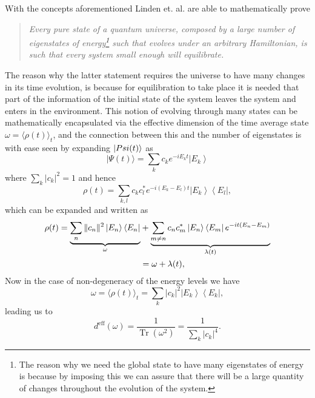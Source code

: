 \indent With the concepts aforementioned Linden et. al. \cite{linden_quantum_2009} are able to mathematically prove
\begin{quote}
\textit{Every pure state of a quantum universe, composed by a large number of eigenstates of energy\footnote{The reason why we need the global state to have many eigenstates of energy is because by imposing this we can assure that there will be a large quantity of changes throughout the evolution of the system.} such that evolves under an arbitrary Hamiltonian, is such that every system small enough will equilibrate.}
\end{quote}
\indent The reason why the latter statement requires the universe to have many changes in its time evolution, is because for equilibration to take place it is needed that part of the information of the initial state of the system leaves the system and enters in the environment. This notion of evolving through many states can be mathematically encapsulated via the effective dimension of the time average state $\omega=\langle\rho(t)\rangle_{t}$, and the connection between this and the number of eigenstates is with ease seen by expanding $\mathinner{|{Psi(t)}\rangle}$ as
\begin{equation}
|\Psi(t)\rangle=\sum_{k} c_{k} e^{-i E_{k} t}\left|E_{k}\right\rangle
\label{CH1:expansion_1}
\end{equation}
where $\sum_{k}\left|c_{k}\right|^{2}=1$ and hence
\begin{equation}
\rho(t)=\sum_{k, l} c_{k} c_{l}^{*} e^{-i\left(E_{k}-E_{l}\right) t}\left|E_{k}\right\rangle\left\langle E_{l}\right|,
\label{CH1:expansion_2}
\end{equation}
which can be expanded and written as
\begin{equation}
\begin{aligned}
\rho(t)=\underbrace{\sum_{n}\|c_{n}\|^{2}\mathinner{|{E_{n}}\rangle}\mathinner{\langle{E_{n}}|}}_{\omega}&+\underbrace{\sum_{m \neq n} c_{n} c_{m}^{*}\mathinner{|{E_{n}}\rangle}\mathinner{\langle{E_{m}}|} e^{-i t\left(E_{n}-E_{m}\right)}}_{\lambda (t)} \\
&=\omega+\lambda(t),
\end{aligned}
\label{CH1:Expansion_to_use_after}
\end{equation}
\indent Now in the case of non-degeneracy of the energy levels we have
\begin{equation}
\omega=\langle\rho(t)\rangle_{t}=\sum_{k}\left|c_{k}\right|^{2}\left|E_{k}\right\rangle\left\langle E_{k}\right|,
\label{CH1:expansion_3}
\end{equation}
leading us to 
\begin{equation}
d^{\mathrm{eff}}(\omega)=\frac{1}{\operatorname{Tr}\left(\omega^{2}\right)}=\frac{1}{\sum_{k}\left|c_{k}\right|^{4}}.
\label{CH1:expansion_4}
\end{equation}
